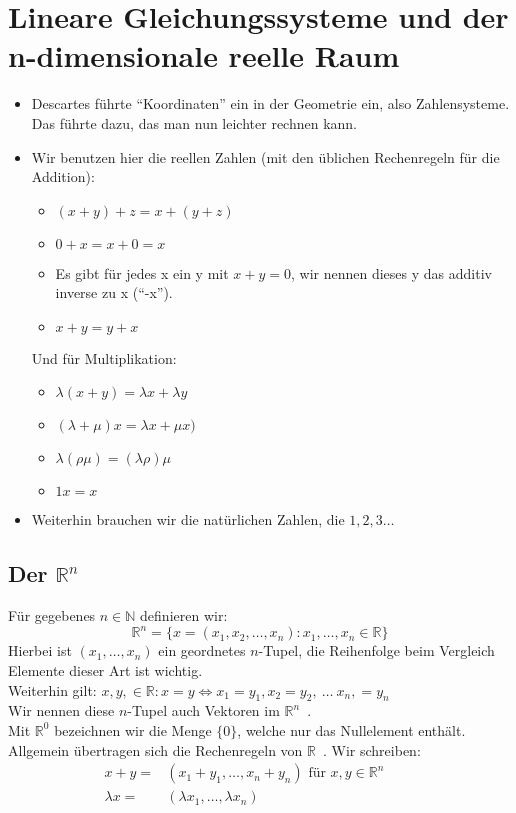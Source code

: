 \documentclass{article}
\newcommand{\lb}{\lambda}
\newcommand{\R}{\mathbb{R}}
\newcommand{\N}{\mathbb{N}}
\newcommand{\mR}{$\mathbb{R}$\ }
\newcommand{\Rn}{\mathbb{R}^n\ }
\newcommand{\mRn}{$\mathbb{R}^n$\ }
\begin{document}
\section{Lineare Gleichungssysteme und der n-dimensionale reelle Raum}
\begin{itemize}
\item{Descartes führte ``Koordinaten'' ein in der Geometrie ein, also Zahlensysteme. Das führte dazu, das man nun leichter rechnen kann.}
\item{Wir benutzen hier die reellen Zahlen (mit den üblichen Rechenregeln für die Addition):
\begin{itemize}
\item{$(x + y) + z = x + (y + z)$}\\
\item{$0 + x = x + 0 = x$}
\item{Es gibt für jedes x ein y mit $x + y = 0$, wir nennen dieses y das additiv inverse zu x (``-x'').}
\item{$x + y = y + x$}
\end{itemize}
Und für Multiplikation:
\begin{itemize}
\item{$\lambda (x + y) = \lambda x + \lambda y$}
\item{$(\lambda + \mu) x = \lambda x + \mu x)$}
\item{$\lb(\rho\mu)=(\lb\rho)\mu$}
\item{$1x = x$}
\end{itemize}
}
\item{Weiterhin brauchen wir die natürlichen Zahlen, die $1,2,3\dots$}
\end{itemize}

\subsection{Der $\R^n$}
Für gegebenes $n \in \N$ definieren wir:\\
$$\R^n = \{x = (x_1, x_2, \dots, x_n): x_1, \dots, x_n \in \R\}$$
Hierbei ist $(x_1, \dots, x_n)$ ein geordnetes $n$-Tupel, die Reihenfolge beim Vergleich Elemente dieser Art ist wichtig.\\
Weiterhin gilt: $x, y, \in \R : x = y \Leftrightarrow x_1 = y_1, x_2 = y_2,\ \dots \ x_n, = y_n$\\
Wir nennen diese $n$-Tupel auch Vektoren im \mRn.\\
Mit $\R^0$ bezeichnen wir die Menge $\{0\}$, welche nur das Nullelement enthält. Allgemein übertragen sich die Rechenregeln von \mR. Wir schreiben:
\begin{align*}
 x + y =& (x_1 + y_1, \dots, x_n + y_n)\text{ für } x, y \in \Rn\qquad \tag*{Vektoraddition}\\
 \lb x = &(\lb x_1, \dots, \lb x_n)\qquad \tag*{Skalarmultiplikation}
\end{align*}
\end{document}
